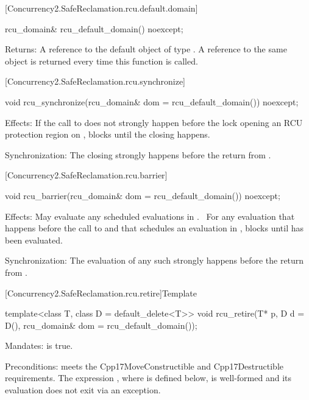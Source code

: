 [Concurrency2.SafeReclamation.rcu.default.domain]{}

\begin{codeblock}
rcu_domain& rcu_default_domain() noexcept;
\end{codeblock}

\pnum
Returns: A reference to the default object of type .
A reference to the same object is returned every time this
function is called.

[Concurrency2.SafeReclamation.rcu.synchronize]{}

\begin{codeblock}
void rcu_synchronize(rcu_domain& dom = rcu_default_domain()) noexcept;
\end{codeblock}

\pnum
Effects: If the call to  does not strongly
happen before the lock opening an RCU protection region 
on , blocks until the  closing 
happens.

\pnum
Synchronization: The  closing  strongly
happens before the return from .

[Concurrency2.SafeReclamation.rcu.barrier]{}

\begin{codeblock}
void rcu_barrier(rcu_domain& dom = rcu_default_domain()) noexcept;
\end{codeblock}

\pnum
Effects: May evaluate any scheduled evaluations in
.  For any evaluation that happens before the call
to  and that schedules an evaluation 
in , blocks until  has been evaluated.  

\pnum
Synchronization: The evaluation of any such  strongly
happens before the return from .

[Concurrency2.SafeReclamation.rcu.retire]{Template }

\begin{codeblock}
template<class T, class D = default_delete<T>>
void rcu_retire(T* p, D d = D(), rcu_domain& dom = rcu_default_domain());
\end{codeblock}

\pnum
Mandates:  is true.

\pnum
Preconditions:  meets the Cpp17MoveConstructible and
Cpp17Destructible requirements.
The expression , where  is defined below, is
well-formed and its evaluation does not exit via an exception.

